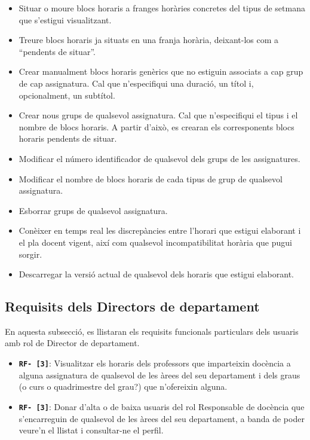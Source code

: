 \documentclass[a4paper,12pt]{ThesisStyle}
\begin{document}
\begin{itemize}
\begin{itemize}
      \item Situar o moure blocs horaris a franges horàries concretes del tipus de setmana que s'estigui visualitzant.
      \item Treure blocs horaris ja situats en una franja horària, deixant-los com a ``pendents de situar''.
      \item Crear manualment blocs horaris genèrics que no estiguin associats a cap grup de cap assignatura. Cal que n'especifiqui una duració, un títol i, opcionalment, un subtítol.
      
      \item Crear nous grups de qualsevol assignatura. Cal que n'especifiqui el tipus i el nombre de blocs horaris. A partir d'això, es crearan els corresponents blocs horaris pendents de situar.
      \item Modificar el número identificador de qualsevol dels grups de les assignatures.
      \item Modificar el nombre de blocs horaris de cada tipus de grup de qualsevol assignatura.
      \item Esborrar grups de qualsevol assignatura.
      \item Conèixer en temps real les discrepàncies entre l'horari que estigui elaborant i el pla docent vigent, així com qualsevol incompatibilitat horària que pugui sorgir.
      
      \item Descarregar la versió actual de qualsevol dels horaris que estigui elaborant.
    \end{itemize}
\end{itemize}

\subsection{Requisits dels Directors de departament} %
\label{subsec:requisits_director_departament}

En aquesta subsecció, es llistaran els requisits funcionals particulars dels usuaris amb rol de Director de departament.

\begin{itemize}
  \item \texttt{\textbf{RF- [3]}}: Visualitzar els horaris dels professors que imparteixin docència a alguna assignatura de qualsevol de les àrees del seu departament i dels graus (o curs o quadrimestre del grau?) que n'ofereixin alguna.
  \item \texttt{\textbf{RF- [3]}}: Donar d'alta o de baixa usuaris del rol Responsable de docència que s'encarreguin de qualsevol de les àrees del seu departament, a banda de poder veure'n el llistat i consultar-ne el perfil.
\end{itemize}
\end{document}
